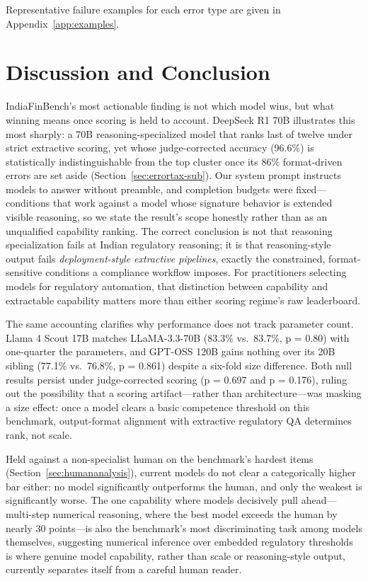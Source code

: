 \documentclass[11pt]{article}
\begin{document}
Representative failure examples for each error type are given in Appendix~\ref{app:examples}.

\section{Discussion and Conclusion}
\label{sec:discussion}

IndiaFinBench's most actionable finding is not which model wins, but what winning means once scoring is held to account. DeepSeek R1 70B illustrates this most sharply: a 70B reasoning-specialized model that ranks last of twelve under strict extractive scoring, yet whose judge-corrected accuracy (96.6\%) is statistically indistinguishable from the top cluster once its 86\% format-driven errors are set aside (Section~\ref{sec:errortax-sub}). Our system prompt instructs models to answer without preamble, and completion budgets were fixed---conditions that work against a model whose signature behavior is extended visible reasoning, so we state the result's scope honestly rather than as an unqualified capability ranking. The correct conclusion is not that reasoning specialization fails at Indian regulatory reasoning; it is that reasoning-style output fails \emph{deployment-style extractive pipelines}, exactly the constrained, format-sensitive conditions a compliance workflow imposes. For practitioners selecting models for regulatory automation, that distinction between capability and extractable capability matters more than either scoring regime's raw leaderboard.

The same accounting clarifies why performance does not track parameter count. Llama 4 Scout 17B matches LLaMA-3.3-70B (83.3\% vs.\ 83.7\%, p = 0.80) with one-quarter the parameters, and GPT-OSS 120B gains nothing over its 20B sibling (77.1\% vs.\ 76.8\%, p = 0.861) despite a six-fold size difference. Both null results persist under judge-corrected scoring (p = 0.697 and p = 0.176), ruling out the possibility that a scoring artifact---rather than architecture---was masking a size effect: once a model clears a basic competence threshold on this benchmark, output-format alignment with extractive regulatory QA determines rank, not scale.

Held against a non-specialist human on the benchmark's hardest items (Section~\ref{sec:humananalysis}), current models do not clear a categorically higher bar either: no model significantly outperforms the human, and only the weakest is significantly worse. The one capability where models decisively pull ahead---multi-step numerical reasoning, where the best model exceeds the human by nearly 30 points---is also the benchmark's most discriminating task among models themselves, suggesting numerical inference over embedded regulatory thresholds is where genuine model capability, rather than scale or reasoning-style output, currently separates itself from a careful human reader.
\end{document}
